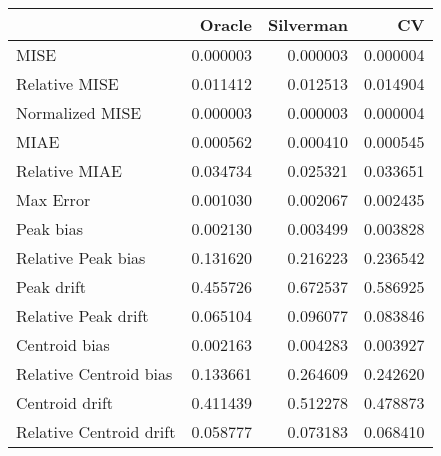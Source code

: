 \begin{tabular}{lrrr}
  \hline
 & Oracle & Silverman & CV \\ 
  \hline
MISE & 0.000003 & 0.000003 & 0.000004 \\ 
  Relative MISE & 0.011412 & 0.012513 & 0.014904 \\ 
  Normalized MISE & 0.000003 & 0.000003 & 0.000004 \\ 
  MIAE & 0.000562 & 0.000410 & 0.000545 \\ 
  Relative MIAE & 0.034734 & 0.025321 & 0.033651 \\ 
  Max Error & 0.001030 & 0.002067 & 0.002435 \\ 
  Peak bias & 0.002130 & 0.003499 & 0.003828 \\ 
  Relative Peak bias & 0.131620 & 0.216223 & 0.236542 \\ 
  Peak drift & 0.455726 & 0.672537 & 0.586925 \\ 
  Relative Peak drift & 0.065104 & 0.096077 & 0.083846 \\ 
  Centroid bias & 0.002163 & 0.004283 & 0.003927 \\ 
  Relative Centroid bias & 0.133661 & 0.264609 & 0.242620 \\ 
  Centroid drift & 0.411439 & 0.512278 & 0.478873 \\ 
  Relative Centroid drift & 0.058777 & 0.073183 & 0.068410 \\ 
   \hline
\end{tabular}
